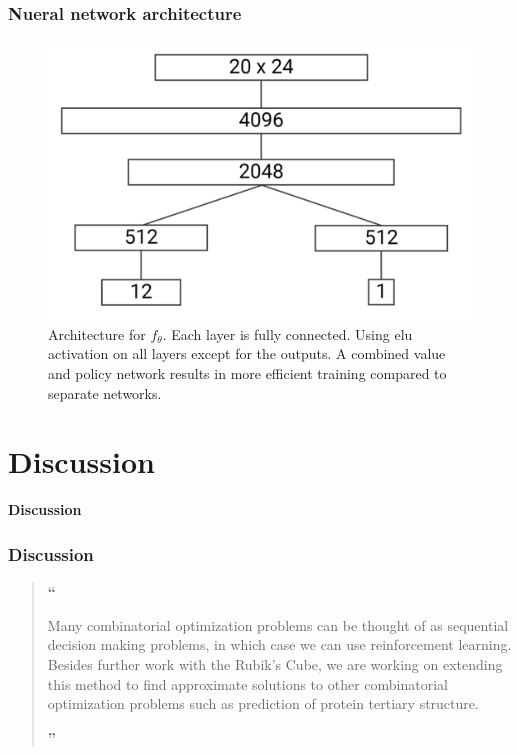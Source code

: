 \documentclass[notheorems, aspectratio=54]{beamer}
\begin{document}
\begin{frame}
    \frametitle{Nueral network architecture}

    \begin{figure}
        \includegraphics[width=.8\textwidth]{fig/deepcube_nn.png}
        \caption{Architecture for $f_{\theta}$. Each layer is fully connected. Using elu activation on all layers except for the outputs. A combined value and policy network results in more efficient training compared to separate networks.}
    \end{figure}
\end{frame}


\section{Discussion}
\begin{frame}
    \center \huge \textbf{Discussion}
\end{frame}

\begin{frame}
    \frametitle{Discussion}

    \begin{quotation}
    \noindent \huge \textbf{``}

    \normalsize Many combinatorial optimization problems can be thought of as sequential decision making problems, in which case we can use reinforcement learning.
    \\[1.5em]
    Besides further work with the Rubik’s Cube, we are working on extending this method to find approximate solutions to other combinatorial optimization problems such as \color{red} prediction of protein tertiary structure\color{black}.

    \noindent \hspace{24em} \huge \textbf{''}
    \end{quotation}
\end{frame}
\end{document}

